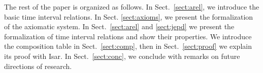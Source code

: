 \documentclass{llncs}
\begin{document}
The rest of the paper is organized as follows. %
In Sect.~\ref{sect:arel}, we introduce the basic time interval relations. In Sect. \ref{sect:axioms}, we present the formalization of the axiomatic system. In Sect.~\ref{sect:arel} and \ref{sect:jepd} we present the formalization of time interval relations and show their properties. We introduce the composition table in Sect.~\ref{sect:comp}, then in Sect.~\ref{sect:proof} we explain its proof with Isar. In Sect.~\ref{sect:conc}, we conclude with remarks on future directions of research.
\end{document}
